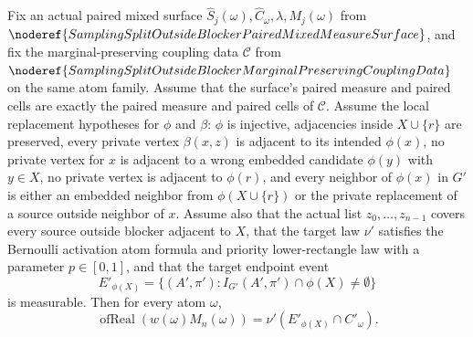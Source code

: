 \begin{helper}
Fix an actual paired mixed surface
\(\widehat S_j(\omega),\widehat C_\omega,\lambda,M_j(\omega)\) from
\(\noderef{SamplingSplitOutsideBlockerPairedMixedMeasureSurface}\), and fix
the marginal-preserving coupling data
\(\mathcal C\) from
\(\noderef{SamplingSplitOutsideBlockerMarginalPreservingCouplingData}\) on
the same atom family.  Assume that the surface's paired measure and paired
cells are exactly the paired measure and paired cells of \(\mathcal C\).
Assume the local replacement hypotheses for \(\phi\) and \(\beta\): \(\phi\)
is injective, adjacencies inside \(X\cup\{r\}\) are preserved, every private
vertex \(\beta(x,z)\) is adjacent to its intended \(\phi(x)\), no private
vertex for \(x\) is adjacent to a wrong embedded candidate \(\phi(y)\) with
\(y\in X\), no private vertex is adjacent to \(\phi(r)\), and every neighbor
of \(\phi(x)\) in \(G'\) is either an embedded neighbor from
\(\phi(X\cup\{r\})\) or the private replacement of a source outside neighbor
of \(x\).  Assume also that the actual list \(z_0,\ldots,z_{n-1}\) covers
every source outside blocker adjacent to \(X\), that the target law \(\nu'\)
satisfies the Bernoulli activation atom formula and priority lower-rectangle
law with a parameter \(p\in[0,1]\), and that the target endpoint event
\[
  E'_{\phi(X)}
  =\{(A',\pi'): I_{G'}(A',\pi')\cap\phi(X)\ne\emptyset\}
\]
is measurable.  Then for every atom \(\omega\),
\[
  \operatorname{ofReal}(w(\omega)M_n(\omega))
  =
  \nu'(E'_{\phi(X)}\cap C'_\omega).
\]
\end{helper}
